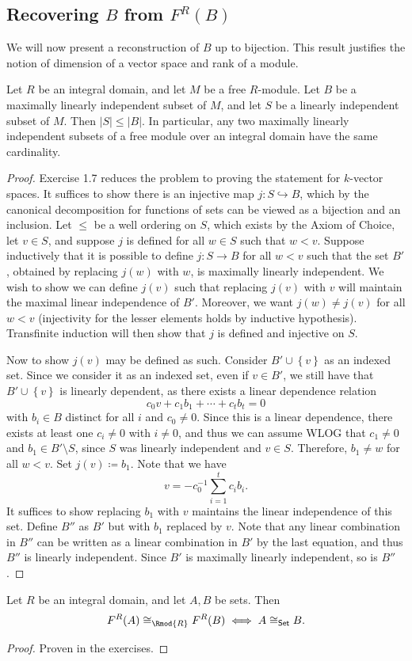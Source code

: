\subsection{Recovering $B$ from $F^R(B)$}
We will now present a reconstruction of $B$ up to bijection. This result justifies the notion of dimension of a vector space and rank of a module.
\begin{proposition}\label{prp:6.2}
	Let $R$ be an integral domain, and let $M$ be a free $R$-module. Let $B$ be a maximally linearly independent subset of $M$, and let $S$ be a linearly independent subset of $M$. Then $\left| S \right| \leq \left| B \right| $. In particular, any two maximally linearly independent subsets of a free module over an integral domain have the same cardinality.
\end{proposition}
\begin{proof}
	Exercise 1.7 reduces the problem to proving the statement for $k$-vector spaces. It suffices to show there is an injective map $j : S \hookrightarrow B$, which by the canonical decomposition for functions of sets can be viewed as a bijection and an inclusion. Let $\leq $ be a well ordering on $S$, which exists by the Axiom of Choice, let $v\in S$, and suppose $j$ is defined for all $w\in S$ such that $w<v$. Suppose inductively that it is possible to define $j : S \to B$ for all $w<v$ such that the set $B'$, obtained by replacing $j(w)$ with $w$, is maximally linearly independent. We wish to show we can define $j(v)$ such that replacing $j(v)$ with $v$ will maintain the maximal linear independence of $B'$. Moreover, we want $j(w)\neq j(v)$ for all $w<v$ (injectivity for the lesser elements holds by inductive hypothesis). Transfinite induction will then show that $j$ is defined and injective on $S$.

	Now to show $j(v)$ may be defined as such. Consider $B'\cup \left\{ v \right\} $ as an indexed set. Since we consider it as an indexed set, even if $v\in B'$, we still have that $B'\cup \left\{ v \right\} $ is linearly dependent, as there exists a linear dependence relation
	\[
		c_0v + c_1b_1+\cdots +c_tb_t = 0
	\]
	with $b_i\in B$ distinct for all $i$ and $c_0\neq 0$. Since this is a linear dependence, there exists at least one $c_i\neq 0$ with $i\neq 0$, and thus we can assume WLOG that $c_1\neq 0$ and $b_1\in B'\setminus S$, since $S$ was linearly independent and $v\in S$. Therefore, $b_1\neq w$ for all $w<v$. Set $j(v)\coloneqq b_1$. Note that we have
	\[
		v=-c_0^{-1} \sum_{i=1}^t c_ib_i
	.\]
	It suffices to show replacing $b_1$ with $v$ maintains the linear independence of this set. Define $B''$ as $B'$ but with $b_1$ replaced by $v$. Note that any linear combination in $B''$ can be written as a linear combination in $B'$ by the last equation, and thus $B''$ is linearly independent. Since $B'$ is maximally linearly independent, so is $B''$.
\end{proof}
\begin{corollary}\label{cor:6.1}
	Let $R$ be an integral domain, and let $A,B$ be sets. Then
	\[
		F^R(A)\cong_{\Rmod{R} } F^R(B)\iff A\cong_{\mathsf{Set} }  B
	.\]
\end{corollary}
\begin{proof}
	Proven in the exercises.
\end{proof}


